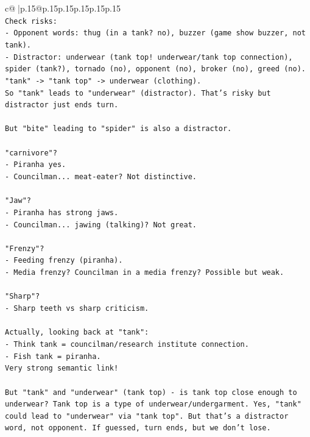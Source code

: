 \documentclass{article}
\begin{document}
{\begin{supertabular}{c@{$\;$}|p{.15\linewidth}@{}p{.15\linewidth}p{.15\linewidth}p{.15\linewidth}p{.15\linewidth}p{.15\linewidth}}
{{{\\ 
\texttt{Check risks:} \\
\texttt{{-} Opponent words: thug (in a tank? no), buzzer (game show buzzer, not tank).} \\
\texttt{{-} Distractor: underwear (tank top! underwear/tank top connection), spider (tank?), tornado (no), opponent (no), broker (no), greed (no).} \\
\texttt{"tank" {-}> "tank top" {-}> underwear (clothing).} \\
\texttt{So "tank" leads to "underwear" (distractor). That's risky but distractor just ends turn.} \\
\\ 
\texttt{But "bite" leading to "spider" is also a distractor.} \\
\\ 
\texttt{"carnivore"?} \\
\texttt{{-} Piranha yes.} \\
\texttt{{-} Councilman... meat{-}eater? Not distinctive.} \\
\\ 
\texttt{"Jaw"?} \\
\texttt{{-} Piranha has strong jaws.} \\
\texttt{{-} Councilman... jawing (talking)? Not great.} \\
\\ 
\texttt{"Frenzy"?} \\
\texttt{{-} Feeding frenzy (piranha).} \\
\texttt{{-} Media frenzy? Councilman in a media frenzy? Possible but weak.} \\
\\ 
\texttt{"Sharp"?} \\
\texttt{{-} Sharp teeth vs sharp criticism.} \\
\\ 
\texttt{Actually, looking back at "tank":} \\
\texttt{{-} Think tank = councilman/research institute connection.} \\
\texttt{{-} Fish tank = piranha.} \\
\texttt{Very strong semantic link!} \\
\\ 
\texttt{But "tank" and "underwear" (tank top) {-} is tank top close enough to underwear? Tank top is a type of underwear/undergarment. Yes, "tank" could lead to "underwear" via "tank top". But that's a distractor word, not opponent. If guessed, turn ends, but we don't lose.} \\
}}}
\end{supertabular}}
\end{document}
